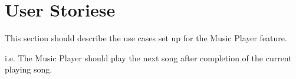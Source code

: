 \section{User Storiese}

This section should describe the use cases set up for the Music Player feature.

i.e. The Music Player should play the next song after completion of the current playing song.